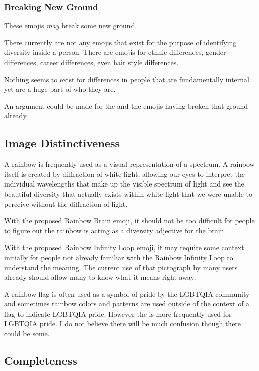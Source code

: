 \subsubsection{Breaking New Ground}

These emojis \emph{may} break some new ground.

There currently are not any emojis that exist for the purpose of identifying diversity inside
a person. There are emojis for ethnic differences, gender differences, career differences,
even hair style differences.

Nothing seems to exist for differences in people that are fundamentally internal yet are a
huge part of who they are.

An argument could be made for the \nerdface{} and the
\prideflag{} emojis having broken that ground already.

\subsection{Image Distinctiveness}

A rainbow is frequently used as a visual representation of a spectrum. A rainbow itself is
created by diffraction of white light, allowing our eyes to interpret the individual
wavelengths that make up the visible spectrum of light and see the beautiful diversity that
actually exists within white light that we were unable to perceive without the diffraction of
light.

With the proposed Rainbow Brain emoji, it should not be too difficult for people to figure out
the rainbow is acting as a diversity adjective for the brain.

With the proposed Rainbow Infinity Loop emoji, it may require some context initially for people
not already familiar with the Rainbow Infinity Loop to understand the meaning. The current use
of that pictograph by many users already should allow many to know what it means right away.

A rainbow flag is often used as a symbol of pride by the LGBTQIA community and sometimes rainbow colors
and patterns are used outside of the context of a flag to indicate LGBTQIA pride. However the
\prideflag{} is more frequently used for
LGBTQIA pride. I do not believe there will be much confusion though there could be some.

\subsection{Completeness}

